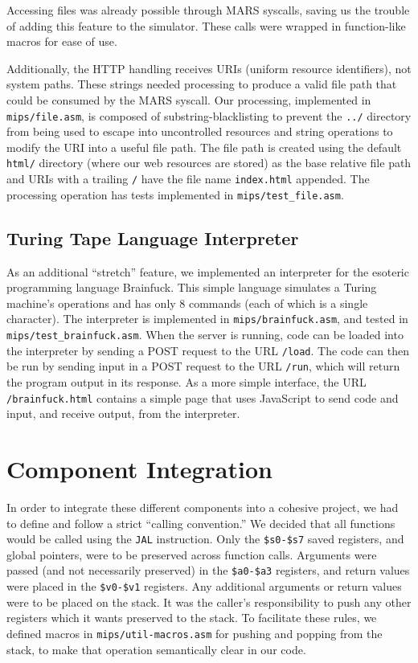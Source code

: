 \documentclass[journal,10pt]{IEEEtran}
\begin{document}
Accessing files was already possible through MARS syscalls, saving us the
trouble of adding this feature to the simulator. These calls were wrapped in
function-like macros for ease of use.

Additionally, the HTTP handling receives URIs (uniform resource identifiers),
not system paths. These strings needed processing to produce a valid file path
that could be consumed by the MARS syscall. Our processing, implemented in
\texttt{mips/file.asm}, is composed of substring-blacklisting to prevent the
\texttt{../} directory from being used to escape into uncontrolled resources and
string operations to modify the URI into a useful file path. The file path is
created using the default \texttt{html/} directory (where our web resources are
stored) as the base relative file path and URIs with a trailing \texttt{/} have
the file name \texttt{index.html} appended. The processing operation has tests
implemented in \texttt{mips/test\_file.asm}.

\subsection{Turing Tape Language Interpreter}

As an additional ``stretch'' feature, we implemented an interpreter for the
esoteric programming language Brainfuck\cite{Mpreu/preller}.  This simple
language simulates a Turing machine's operations and has only 8 commands (each
of which is a single character).  The interpreter is implemented in
\texttt{mips/brainfuck.asm}, and tested in \texttt{mips/test\_brainfuck.asm}.
When the server is running, code can be loaded into the interpreter by sending a
POST request to the URL \texttt{/load}.  The code can then be run by sending
input in a POST request to the URL \texttt{/run}, which will return the program
output in its response.  As a more simple interface, the URL
\texttt{/brainfuck.html} contains a simple page that uses JavaScript to send
code and input, and receive output, from the interpreter.

\section{Component Integration}

In order to integrate these different components into a cohesive project, we had
to define and follow a strict ``calling convention.''  We decided that all
functions would be called using the \texttt{JAL} instruction.  Only the
\texttt{\$s0-\$s7} saved registers, and global pointers, were to be preserved
across function calls. Arguments were passed (and not necessarily preserved) in
the \texttt{\$a0-\$a3} registers, and return values were placed in the
\texttt{\$v0-\$v1} registers. Any additional arguments or return values were to
be placed on the stack. It was the caller's responsibility to push any other
registers which it wants preserved to the stack.  To facilitate these rules, we
defined macros in \texttt{mips/util-macros.asm} for pushing and popping from the
stack, to make that operation semantically clear in our code.
\end{document}
